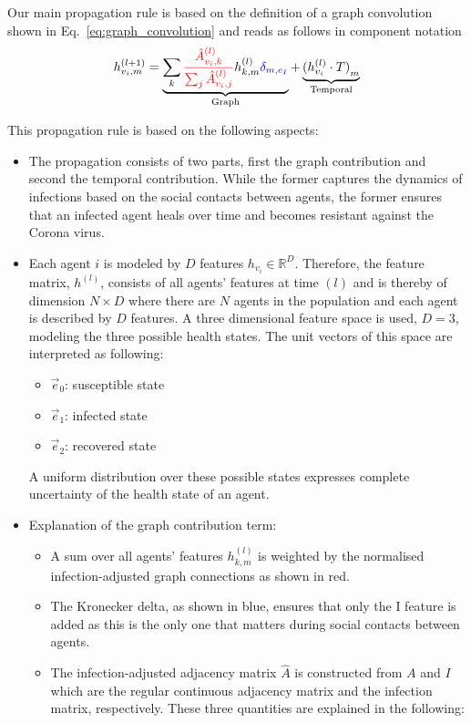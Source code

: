 Our main propagation rule is based on the definition of a graph convolution shown in Eq.~\eqref{eq:graph_convolution} and reads as follows in component notation
\begin{equation}
	h_{v_i, m}^{(l+1)}
	=
	\underbrace{
		\sum_k \textcolor{red}{\frac{\hat{A}_{v_i, k}^{(l)}}{\sum_j \hat{A}_{v_i, j}^{(l)}}} h_{k, m}^{(l)} \textcolor{blue}{\delta_{m, e_I}}
	}_{\text{Graph}}
	+
	\underbrace{
		{(h_{v_i}^{(l)}\cdot T)}_m
	}_{\text{Temporal}}
\end{equation}

This propagation rule is based on the following aspects:

\begin{itemize}
	\item The propagation consists of two parts, first the graph contribution and second the temporal contribution. While the former captures the dynamics of infections based on the social contacts between agents, the former ensures that an infected agent heals over time and becomes resistant against the Corona virus.
	\item Each agent $i$ is modeled by $D$ features $h_{v_i}\in\mathbb{R}^D$. Therefore, the feature matrix, $h^{(l)}$, consists of all agents' features at time $(l)$ and is thereby of dimension $N\times D$ where there are $N$ agents in the population and each agent is described by $D$ features. A three dimensional feature space is used, $D=3$, modeling the three possible health states. The unit vectors of this space are interpreted as following:
	\begin{itemize}
		\item $\vec{e}_0$: susceptible state
		\item $\vec{e}_1$: infected state
		\item $\vec{e}_2$: recovered state
	\end{itemize}
	A uniform distribution over these possible states expresses complete uncertainty of the health state of an agent.
	\item Explanation of the graph contribution term:
	\begin{itemize}
		\item A sum over all agents' features $h_{k,m}^{(l)}$ is weighted by the normalised infection-adjusted graph connections as shown in red.
		\item The Kronecker delta, as shown in blue, ensures that only the I feature is added as this is the only one that matters during social contacts between agents.
		\item The infection-adjusted adjacency matrix $\hat{A}$ is constructed from $A$ and $I$ which are the regular continuous adjacency matrix and the infection matrix, respectively. These three quantities are explained in the following:

\end{itemize}
\end{itemize}
